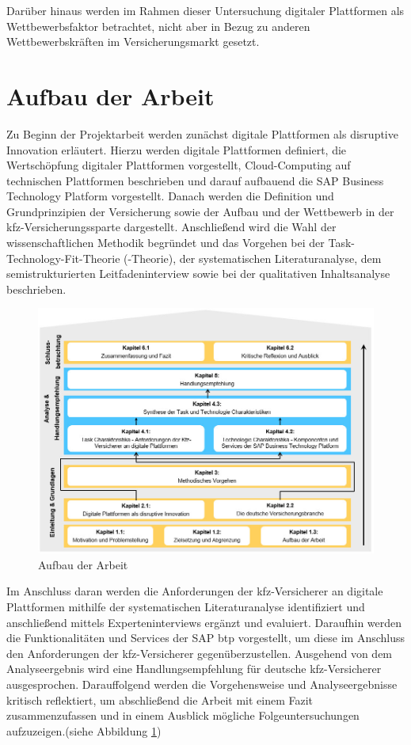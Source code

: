 Darüber hinaus werden im Rahmen dieser Untersuchung digitaler Plattformen als Wettbewerbsfaktor betrachtet, nicht aber in Bezug zu anderen Wettbewerbskräften im Versicherungsmarkt gesetzt.




\section{Aufbau der Arbeit}

Zu Beginn der Projektarbeit werden zunächst digitale Plattformen als disruptive Innovation erläutert. Hierzu werden digitale Plattformen definiert, die Wertschöpfung digitaler Plattformen vorgestellt, Cloud-Computing auf technischen Plattformen beschrieben und darauf aufbauend die SAP Business Technology Platform vorgestellt. Danach werden die Definition und Grundprinzipien der Versicherung sowie der Aufbau und der Wettbewerb in der \ac{kfz}-Versicherungssparte dargestellt. Anschließend wird die Wahl der wissenschaftlichen Methodik begründet und das Vorgehen bei der Task-Technology-Fit-Theorie (-Theorie), der systematischen Literaturanalyse, dem semistrukturierten Leitfadeninterview sowie bei der qualitativen Inhaltsanalyse beschrieben.

\begin{figure}[h]
    \centering
    \includegraphics[width=1\textwidth]{img/Aufbau_der_Arbeit2.jpg}
    \caption[Aufbau der Arbeit]{Aufbau der Arbeit\autocite{Aufbau}}
    \label{fig:Aufbau}
\end{figure}

Im Anschluss daran werden die Anforderungen der \ac{kfz}-Versicherer an digitale Plattformen mithilfe der systematischen Literaturanalyse identifiziert und anschließend mittels Experteninterviews ergänzt und evaluiert. Daraufhin werden die Funktionalitäten und Services der SAP \ac{btp} vorgestellt, um diese im Anschluss den Anforderungen der \ac{kfz}-Versicherer gegenüberzustellen. Ausgehend von dem Analyseergebnis wird eine Handlungsempfehlung für deutsche \ac{kfz}-Versicherer ausgesprochen. Darauffolgend werden die Vorgehensweise und Analyseergebnisse kritisch reflektiert, um abschließend die Arbeit mit einem Fazit zusammenzufassen und in einem Ausblick mögliche Folgeuntersuchungen aufzuzeigen.(siehe Abbildung \ref{fig:Aufbau})




\newpage